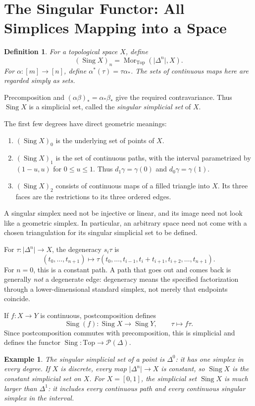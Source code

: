 \documentclass[11pt]{article}
\theoremstyle{linked}
\theoremstyle{plainlecture}
\newtheorem{definition}[proposition]{Definition}
\newtheorem{example}[proposition]{Example}
\newcommand{\Mor}{\operatorname{Mor}}
\newcommand{\PSh}{\mathcal{P}}
\newcommand{\Sing}{\operatorname{Sing}}
\newcommand{\Top}{\mathrm{Top}}
\begin{document}
\section{The Singular Functor: All Simplices Mapping into a Space}
\begin{definition}
For a topological space $X$, define
\[
(\Sing X)_n=\Mor_\Top(\lvert\Delta^{n}\rvert,X).
\]
For $\alpha:[m]\to[n]$, define $\alpha^*(\tau)=\tau\alpha_*$. The sets of continuous maps here are regarded simply as sets.
\end{definition}
Precomposition and $(\alpha\beta)_*=\alpha_*\beta_*$ give the required contravariance. Thus $\Sing X$ is a simplicial set, called the \emph{singular simplicial set} of $X$.

The first few degrees have direct geometric meanings:
\begin{enumerate}
\item $(\Sing X)_0$ is the underlying set of points of $X$.
\item $(\Sing X)_1$ is the set of continuous paths, with the interval parametrized by $(1-u,u)$ for $0\leq u\leq1$. Thus $d_1\gamma=\gamma(0)$ and $d_0\gamma=\gamma(1)$.
\item $(\Sing X)_2$ consists of continuous maps of a filled triangle into $X$. Its three faces are the restrictions to its three ordered edges.
\end{enumerate}
A singular simplex need not be injective or linear, and its image need not look like a geometric simplex. In particular, an arbitrary space need not come with a chosen triangulation for its singular simplicial set to be defined.

For $\tau:\lvert\Delta^{n}\rvert\to X$, the degeneracy $s_i\tau$ is
\[
(t_0,\ldots,t_{n+1})\longmapsto
\tau(t_0,\ldots,t_{i-1},t_i+t_{i+1},t_{i+2},\ldots,t_{n+1}).
\]
For $n=0$, this is a constant path. A path that goes out and comes back is generally \emph{not} a degenerate edge: degeneracy means the specified factorization through a lower-dimensional standard simplex, not merely that endpoints coincide.

If $f:X\to Y$ is continuous, postcomposition defines
\[
\Sing(f):\Sing X\to\Sing Y,\qquad \tau\longmapsto f\tau.
\]
Since postcomposition commutes with precomposition, this is simplicial and defines the functor $\Sing:\Top\to\PSh(\Delta)$.

\begin{example}
The singular simplicial set of a point is $\Delta^{0}$: it has one simplex in every degree. If $X$ is discrete, every map $\lvert\Delta^{n}\rvert\to X$ is constant, so $\Sing X$ is the constant simplicial set on $X$. For $X=[0,1]$, the simplicial set $\Sing X$ is much larger than $\Delta^{1}$: it includes every continuous path and every continuous singular simplex in the interval.
\end{example}
\end{document}
